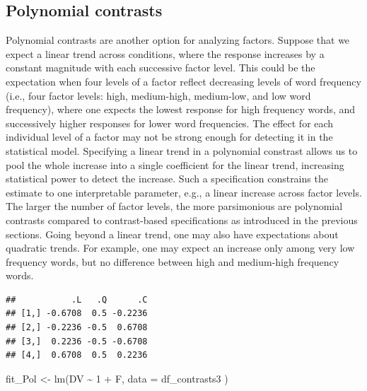 \documentclass[
  12pt,
]{krantz}
\newenvironment{Shaded}{\begin{snugshade}}{\end{snugshade}}
\newcommand{\AttributeTok}[1]{\textcolor[rgb]{0.77,0.63,0.00}{#1}}
\newcommand{\DecValTok}[1]{\textcolor[rgb]{0.00,0.00,0.81}{#1}}
\newcommand{\FunctionTok}[1]{\textcolor[rgb]{0.00,0.00,0.00}{#1}}
\newcommand{\NormalTok}[1]{#1}
\newcommand{\OtherTok}[1]{\textcolor[rgb]{0.56,0.35,0.01}{#1}}
\newcommand{\SpecialCharTok}[1]{\textcolor[rgb]{0.00,0.00,0.00}{#1}}
\theoremstyle{definition}
\theoremstyle{definition}
\theoremstyle{definition}
\theoremstyle{definition}
\theoremstyle{remark}
\begin{document}
\hypertarget{polynomialContrasts}{%
\subsection{Polynomial contrasts}\label{polynomialContrasts}}

Polynomial contrasts are another option for analyzing factors. Suppose that we expect a linear trend across conditions, where the response increases by a constant magnitude with each successive factor level. This could be the expectation when four levels of a factor reflect decreasing levels of word frequency (i.e., four factor levels: high, medium-high, medium-low, and low word frequency), where one expects the lowest response for high frequency words, and successively higher responses for lower word frequencies. The effect for each individual level of a factor may not be strong enough for detecting it in the statistical model. Specifying a linear trend in a polynomial constrast allows us to pool the whole increase into a single coefficient for the linear trend, increasing statistical power to detect the increase. Such a specification constrains the estimate to one interpretable parameter, e.g., a linear increase across factor levels. The larger the number of factor levels, the more parsimonious are polynomial contrasts compared to contrast-based specifications as introduced in the previous sections. Going beyond a linear trend, one may also have expectations about quadratic trends. For example, one may expect an increase only among very low frequency words, but no difference between high and medium-high frequency words.

\begin{Shaded}
\end{Shaded}

\begin{verbatim}
##           .L   .Q      .C
## [1,] -0.6708  0.5 -0.2236
## [2,] -0.2236 -0.5  0.6708
## [3,]  0.2236 -0.5 -0.6708
## [4,]  0.6708  0.5  0.2236
\end{verbatim}

\begin{Shaded}
\begin{Highlighting}[]
\NormalTok{fit\_Pol }\OtherTok{\textless{}{-}} \FunctionTok{lm}\NormalTok{(DV }\SpecialCharTok{\textasciitilde{}} \DecValTok{1} \SpecialCharTok{+}\NormalTok{ F,}
  \AttributeTok{data =}\NormalTok{ df\_contrasts3}
\NormalTok{)}
\end{Highlighting}
\end{Shaded}
\end{document}
